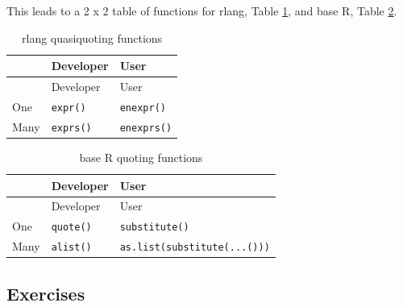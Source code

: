 \documentclass[]{book}
\begin{document}
This leads to a 2 x 2 table of functions for rlang, Table \ref{tab:quoting-rlang}, and base R, Table \ref{tab:quoting-base}.

\begin{longtable}[]{@{}lll@{}}
\caption{\label{tab:quoting-rlang} rlang quasiquoting functions}\tabularnewline
\toprule
& Developer & User\tabularnewline
\midrule
\endfirsthead
\toprule
& Developer & User\tabularnewline
\midrule
\endhead
One & \texttt{expr()} & \texttt{enexpr()}\tabularnewline
Many & \texttt{exprs()} & \texttt{enexprs()}\tabularnewline
\bottomrule
\end{longtable}

\begin{longtable}[]{@{}lll@{}}
\caption{\label{tab:quoting-base} base R quoting functions}\tabularnewline
\toprule
& Developer & User\tabularnewline
\midrule
\endfirsthead
\toprule
& Developer & User\tabularnewline
\midrule
\endhead
One & \texttt{quote()} & \texttt{substitute()}\tabularnewline
Many & \texttt{alist()} & \texttt{as.list(substitute(...()))}\tabularnewline
\bottomrule
\end{longtable}

\hypertarget{exercises-5}{%
\subsection{Exercises}\label{exercises-5}}
\end{document}
